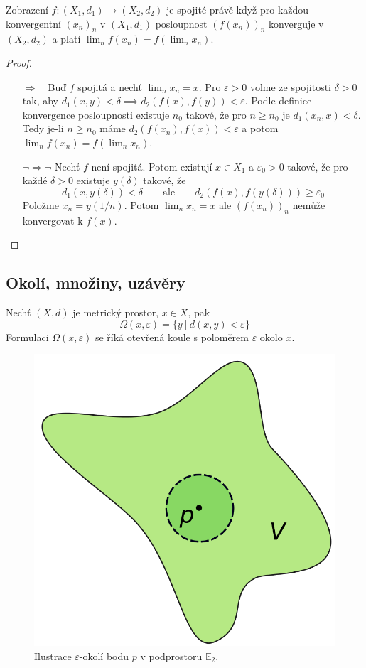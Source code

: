 \documentclass[../main.tex]{subfiles}
\begin{document}
\begin{theorem}
	Zobrazení $f: (X_1,d_1) \rightarrow (X_2,d_2)$ je spojité právě když pro každou konvergentní $(x_n)_n$ v $(X_1,d_1)$ 
	posloupnost $(f(x_n))_n$ konverguje v $(X_2,d_2)$ a platí $\lim_n f(x_n) = f(\lim_n x_n)$.
\end{theorem}

\begin{proof}
	\hfill %
	\begin{itemize}
		\item[$\Rightarrow \phantom{\lnot}$] Buď $f$ spojitá a nechť $\lim_nx_n = x$. Pro $\varepsilon > 0$ volme ze spojitosti $\delta > 0$
		tak, aby $d_1(x,y) <\delta \implies d_2(f(x),f(y)) <\varepsilon$.
		Podle definice konvergence posloupnosti existuje $n_0$ takové, že pro $n \ge n_0$ je $d_1(x_n,x) < \delta$. Tedy je-li $n \ge n_0$
		máme $d_2(f(x_n),f(x)) < \varepsilon$ a potom $\lim_n f(x_n) = f(\lim_n x_n)$.
		\item[$\lnot \Rightarrow  \lnot$] Nechť $f$ není spojitá.
		Potom existují $x \in X_1$ a $\varepsilon_0 > 0$ takové, že pro každé $\delta > 0$ existuje $y(\delta)$ takové, že
		$$d_1(x, y(\delta)) < \delta \qquad \text{ale} \qquad d_2(f(x), f(y(\delta))) \ge \varepsilon_0$$
		Položme $x_n = y(1/n)$. Potom $\lim_n x_n = x$ ale $(f(x_n))_n$ nemůže konvergovat k $f(x)$.
	\end{itemize}
\end{proof}



\subsection{Okolí, množiny, uzávěry}
\begin{definition}[Okolí]
	Nechť $(X,d)$ je metrický prostor, $x\in X$, pak
	$$\Omega (x,\varepsilon) = \{ y\ |\ d(x,y) < \varepsilon \}$$
	Formulaci $\Omega (x,\varepsilon)$ se říká otevřená koule s poloměrem $\varepsilon$ okolo $x$.
\end{definition}

\begin{figure}[h]
	\centering
	\includegraphics[width=0.2\linewidth]{01-neighbourhood}%
	\caption{Ilustrace \(\varepsilon\)-okolí bodu \(p\) v podprostoru \(\mathbb{E}_2\).}%
\end{figure}
\end{document}
